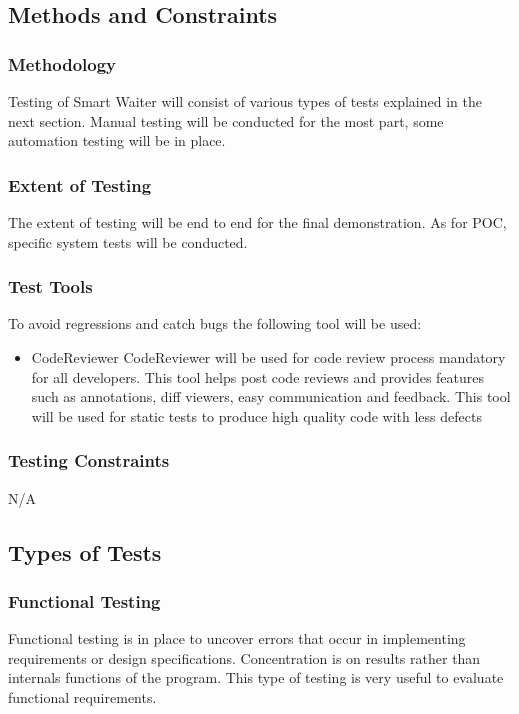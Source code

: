 \documentclass[12pt]{article}
\begin{document}
\subsection{ Methods and Constraints} 

\subsubsection{Methodology} 
Testing of Smart Waiter will consist of various types of tests explained in the next section. Manual testing will be conducted for the most part, some automation testing will be in place.

\subsubsection{Extent of Testing}
The extent of testing will be end to end for the final demonstration. As for POC, specific system tests will be conducted.

\subsubsection{Test Tools}
To avoid regressions and catch bugs the following tool will be used:
\begin{itemize}
\item CodeReviewer \textemdash CodeReviewer will be used for code review process mandatory for all developers. This tool helps post code reviews and provides features such as annotations, diff viewers, easy communication and feedback. This tool will be used for static tests to produce high quality code with less defects
 \end{itemize}

\subsubsection{ Testing Constraints}
N/A

\subsection{Types of Tests}

\subsubsection{Functional Testing}
Functional testing is in place to uncover errors that occur in implementing requirements or design specifications. Concentration is on results rather than internals functions of the program. This type of testing is very useful to evaluate functional requirements.
\end{document}
